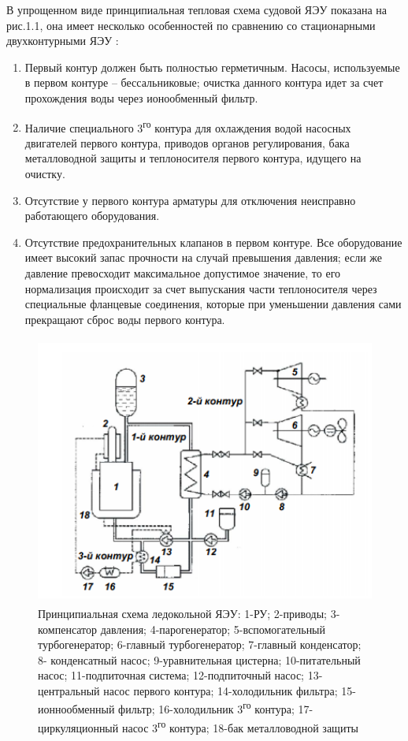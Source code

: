 В упрощенном виде принципиальная тепловая схема судовой ЯЭУ показана на
рис.1.1, она имеет несколько особенностей по сравнению со стационарными
двухконтурными ЯЭУ \cite{xlopkin}:

\begin{enumerate}
\item
  Первый контур должен быть полностью герметичным. Насосы, используемые
  в первом контуре -- бессальниковые; очистка данного контура идет за
  счет прохождения воды через ионообменный фильтр.
\item
  Наличие специального 3\textsuperscript{го} контура для охлаждения
  водой насосных двигателей первого контура, приводов органов
  регулирования, бака металловодной защиты и теплоносителя первого
  контура, идущего на очистку.
\item
  Отсутствие у первого контура арматуры для отключения неисправно
  работающего оборудования.
\item
  Отсутствие предохранительных клапанов в первом контуре. Все
  оборудование имеет высокий запас прочности на случай превышения
  давления; если же давление превосходит максимальное допустимое
  значение, то его нормализация происходит за счет выпускания части
  теплоносителя через специальные фланцевые соединения, которые при
  уменьшении давления сами прекращают сброс воды первого контура.
\end{enumerate}

\begin{figure}[!h]
\center
\includegraphics[width=4.56942in,height=3.48958in]{media/image1.png}
\caption{Принципиальная схема ледокольной ЯЭУ: 1-РУ; 2-приводы;
3-компенсатор давления; 4-парогенератор; 5-вспомогательный
турбогенератор; 6-главный турбогенератор; 7-главный конденсатор; 8-
конденсатный насос; 9-уравнительная цистерна; 10-питательный насос;
11-подпиточная система; 12-подпиточный насос; 13-центральный насос
первого контура; 14-холодильник фильтра; 15-ионнообменный фильтр;
16-холодильник 3\textsuperscript{го} контура; 17-циркуляционный насос
3\textsuperscript{го} контура; 18-бак металловодной защиты}
\end{figure}

